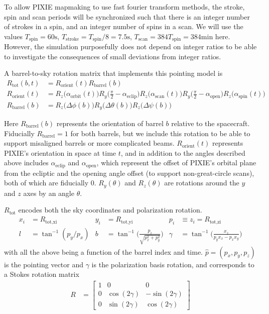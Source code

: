 \documentclass{article}
\begin{document}
To allow PIXIE mapmaking to use fast fourier transform methods, the stroke, spin
and scan periods will be synchronized such that there is an integer number of
strokes in a spin, and an integer number of spins in a scan. We will use the
values $T_\textrm{spin} = 60 \textrm{s}$, $T_\textrm{stroke} = T_\textrm{spin}/8 =
7.5 \textrm{s}$, $T_\textrm{scan} = 384 T_\textrm{spin} = 384 \textrm{min}$ here.
However, the simulation purposefully does not depend on integer ratios to be able
to investigate the consequences of small deviations from integer ratios.

A barrel-to-sky rotation matrix that implements this pointing model is
\begin{align}
	R_\textrm{tot}(b,t)  &= R_\textrm{orient}(t)R_\textrm{barrel}(b) \\
	R_\textrm{orient}(t) &= R_z\big(\alpha_\textrm{orbit}(t)\big)
		R_y\Big(\frac\pi2-\alpha_\textrm{eclip}\Big)
		R_z\big(\alpha_\textrm{scan}(t)\big)R_y\Big(\frac\pi2-\alpha_\textrm{open}\Big)
		R_z\big(\alpha_\textrm{spin}(t)\big) \\
	R_\textrm{barrel}(b) &= R_z\big(\Delta\phi(b)\big)R_y\big(\Delta\theta(b)\big)R_z\big(\Delta\psi(b)\big)
\end{align}

Here $R_\textrm{barrel}(b)$ represents the orientation of barrel $b$ relative
to the spacecraft. Fiducially $R_\textrm{barrel} = 1$ for both barrels, but
we include this rotation to be able to support misaligned barrels or more
complicated beams. $R_\textrm{orient}(t)$ represents PIXIE's orientation
in space at time $t$, and in addition to the angles described above includes
$\alpha_\textrm{eclip}$ and $\alpha_\textrm{open}$, which represent the
offset of PIXIE's orbital plane from the ecliptic and the opening angle
offset (to support non-great-circle scans), both of which are fiducially 0.
$R_y(\theta)$ and $R_z(\theta)$ are rotations around the $y$ and $z$ axes
by an angle $\theta$.

$R_\textrm{tot}$ encodes both the sky coordinates and polarization rotation.
\begin{align}
	x_i &= R_\textrm{tot,xi} & y_i &= R_\textrm{tot,yi} & p_i &\equiv z_i = R_\textrm{tot,zi} \\
	l        &= \tan^{-1}(p_y/p_x)  &
	b        &= \tan^{-1}\Big(\frac{p_z}{\sqrt{p_x^2+p_y^2}}\Big) &
	\gamma   &= \tan^{-1}\Big(\frac{x_z}{p_y x_x - p_x x_y}\Big)
\end{align}
with all the above being a function of the barrel index and time.
$\hat p = (p_x,p_y,p_z)$ is the pointing vector and $\gamma$ is the
polarization basis rotation, and corresponds to a Stokes rotation
matrix
\begin{align}
	R &= \begin{bmatrix}
		1 & 0 & 0 \\
		0 & \cos(2\gamma) & -\sin(2\gamma) \\
		0 & \sin(2\gamma) & \cos(2\gamma)
	\end{bmatrix}
\end{align}
\end{document}
